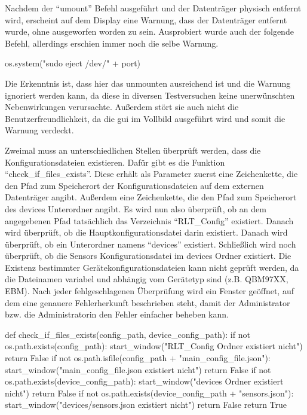 Nachdem der \enquote{umount} Befehl ausgeführt und der Datenträger physisch entfernt wird, erscheint auf dem Display eine Warnung, dass der Datenträger entfernt wurde, ohne ausgeworfen worden zu sein. Ausprobiert wurde auch der folgende Befehl, allerdings erschien immer noch die selbe Warnung. \cite[vgl.][]{Totor:2022}
\begin{pythoncode}
	os.system("sudo eject /dev/" + port)
\end{pythoncode}
Die Erkenntnis ist, dass hier das unmounten ausreichend ist und die Warnung ignoriert werden kann, da diese in diversen Testversuchen keine unerwünschten Nebenwirkungen verursachte. Außerdem stört sie auch nicht die Benutzerfreundlichkeit, da die \acs{gui} im Vollbild ausgeführt wird und somit die Warnung verdeckt.

Zweimal muss an unterschiedlichen Stellen überprüft werden, dass die Konfigurationsdateien existieren. Dafür gibt es die Funktion \enquote{check\_if\_files\_exists}. Diese erhält als Parameter zuerst eine Zeichenkette, die den Pfad zum Speicherort der Konfigurationsdateien auf dem externen Datenträger angibt. Außerdem eine Zeichenkette, die den Pfad zum Speicherort des devices Unterordner angibt. Es wird nun also überprüft, ob an dem angegebenen Pfad tatsächlich das Verzeichnis \enquote{RLT\_Config} existiert. Danach wird überprüft, ob die Hauptkonfigurationsdatei darin existiert. Danach wird überprüft, ob ein Unterordner namens \enquote{devices} existiert. Schließlich wird noch überprüft, ob die Sensors Konfigurationsdatei im devices Ordner existiert. Die Existenz bestimmter Gerätekonfigurationsdateien kann nicht geprüft werden, da die Dateinamen variabel und abhängig vom Gerätetyp sind (z.B. QBM97XX, EBM). Nach jeder fehlgeschlagenen Überprüfung wird ein Fenster geöffnet, auf dem eine genauere Fehlerherkunft beschrieben steht, damit der Administrator bzw. die Administratorin den Fehler einfacher beheben kann.
\begin{pythoncode}
def check_if_files_exists(config_path, device_config_path):
	if not os.path.exists(config_path):
		start_window("RLT_Config Ordner existiert nicht")
		return False
	if not os.path.isfile(config_path + "main_config_file.json"):
		start_window("main_config_file.json existiert nicht")
		return False
	if not os.path.exists(device_config_path):
		start_window("devices Ordner existiert nicht")
		return False
	if not os.path.exists(device_config_path + "sensors.json"):
		start_window("devices/sensors.json existiert nicht")
		return False
	return True
\end{pythoncode}